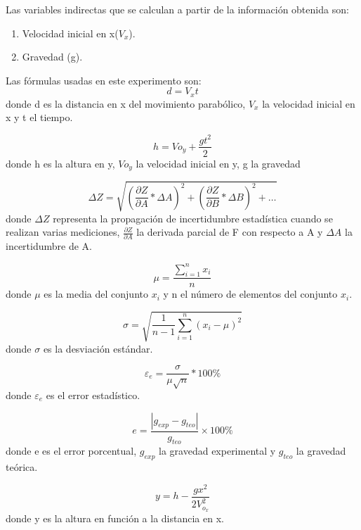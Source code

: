 \documentclass[a4paper]{article}
\begin{document}
Las variables indirectas que se calculan a partir de la información obtenida son:
\begin{enumerate}
  \item Velocidad inicial en x($V_x$).
  \item Gravedad (g).
\end{enumerate}

Las fórmulas usadas en este experimento son:
\begin{equation}
    d=V_xt
\end{equation}
donde d es la distancia en x del movimiento parabólico, $V_x$ la velocidad inicial en x y t el tiempo.

\begin{equation}
   h=Vo_y+\frac{gt^2}{2}
\end{equation}
donde h es la altura en y, $Vo_y$ la velocidad inicial en y, g la gravedad

\begin{equation}
\Delta Z = \sqrt{{(\frac{\partial Z}{\partial A}*\Delta A)}^2+{(\frac{\partial Z}{\partial B}*\Delta B)}^2+\dots}
\end{equation}
donde $\Delta Z$ representa la propagación de incertidumbre estadística cuando se realizan varias mediciones, $\frac{\partial Z}{\partial A}$ la derivada parcial de F con respecto a A y $\Delta A$ la incertidumbre de A.

\begin{equation}
\mu= \frac{\displaystyle\sum_{i=1}^{n} x_i}{n}
\end{equation}
donde $\mu$ es la media del conjunto $x_i$ y n el número de elementos del conjunto $x_i$.

\begin{equation}
\sigma = \sqrt{\frac{1}{n-1}\displaystyle\sum_{i=1}^{n} {(x_i-\mu)}^2}
\end{equation}
donde $\sigma$ es la desviación estándar.

\begin{equation}
\varepsilon_e=\frac{\sigma}{\mu \sqrt{n}}*100\%
\end{equation}
donde $\varepsilon_e$ es el error estadístico.

\begin{equation}
e=\frac{|g_{exp}-g_{teo}|}{g_{teo}}\times 100\%
\end{equation}
donde e es el error porcentual, $g_{exp}$ la gravedad experimental y $g_{teo}$ la gravedad teórica.

\begin{equation}
y=h-\frac{gx^2}{2V_{o_x}^2}
\end{equation}
donde y es la altura en función a la distancia en x.
\end{document}
